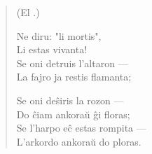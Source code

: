 \begin{verse}
\begin{center}
\footnotesize (El .)
\end{center}
                     Ne diru: "li mortis",\\
                     \vin  Li estas vivanta!\\
                     Se oni detruis l'altaron ---\\
                     \vin  La fajro ja restis flamanta;

                     Se oni de\^siris la rozon ---\\
                     \vin  Do \^ciam ankora\u u \^gi floras;\\
                     Se l'harpo e\^c estas rompita ---\\
                     \vin  L'arkordo ankora\u u do ploras.

\end{verse}

\smallrule{}